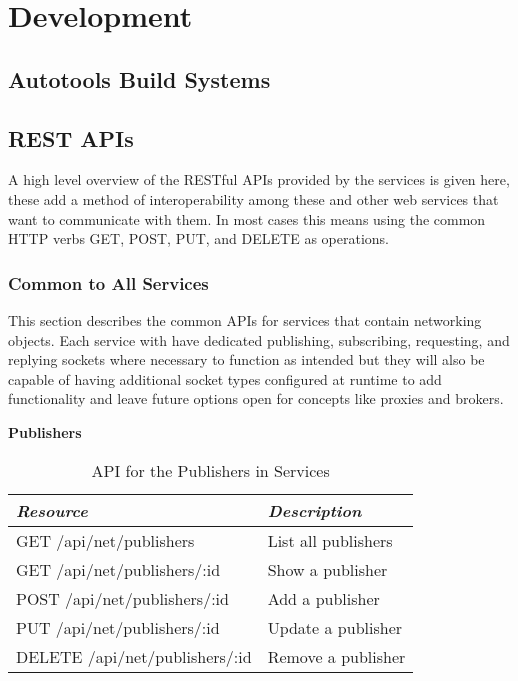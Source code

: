 \section{Development}\label{sec:dev}

  \subsection{Autotools Build Systems}\label{sec:dev-ac}

  \subsection{REST APIs}\label{sec:rest}

    A high level overview of the RESTful APIs provided by the services is given
    here, these add a method of interoperability among these and other web
    services that want to communicate with them. In most cases this means using
    the common HTTP verbs GET, POST, PUT, and DELETE as operations.

    \subsubsection{Common to All Services}\label{sec:rest-common}

      This section describes the common APIs for services that contain
      networking objects. Each service with have dedicated publishing,
      subscribing, requesting, and replying sockets where necessary to function
      as intended but they will also be capable of having additional socket
      types configured at runtime to add functionality and leave future options
      open for concepts like proxies and brokers.

      \large{\textbf{Publishers}}

      \begin{table}[H]
        \centering
        \begin{tabular}{p{8cm} p{10cm}}
          \toprule
          \emph{Resource} & \emph{Description} \\ [0.5ex]
          \midrule
          GET /api/net/publishers & List all publishers \\
          GET /api/net/publishers/:id & Show a publisher \\
          POST /api/net/publishers/:id & Add a publisher \\
          PUT /api/net/publishers/:id & Update a publisher \\
          DELETE /api/net/publishers/:id & Remove a publisher \\
          \bottomrule
        \end{tabular}
        \caption{API for the Publishers in Services}\label{tab:rest-common-pub}
      \end{table}

